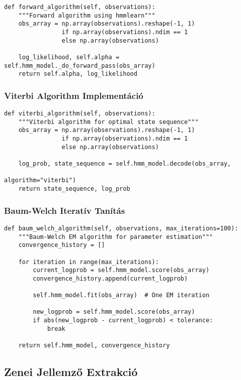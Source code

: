 \begin{verbatim}
def forward_algorithm(self, observations):
    """Forward algorithm using hmmlearn"""
    obs_array = np.array(observations).reshape(-1, 1) 
                if np.array(observations).ndim == 1 
                else np.array(observations)
    
    log_likelihood, self.alpha = self.hmm_model._do_forward_pass(obs_array)
    return self.alpha, log_likelihood
\end{verbatim}

\subsubsection{Viterbi Algorithm Implementáció}

\begin{verbatim}
def viterbi_algorithm(self, observations):
    """Viterbi algorithm for optimal state sequence"""
    obs_array = np.array(observations).reshape(-1, 1) 
                if np.array(observations).ndim == 1 
                else np.array(observations)
    
    log_prob, state_sequence = self.hmm_model.decode(obs_array, 
                                                   algorithm="viterbi")
    return state_sequence, log_prob
\end{verbatim}

\subsubsection{Baum-Welch Iteratív Tanítás}

\begin{verbatim}
def baum_welch_algorithm(self, observations, max_iterations=100):
    """Baum-Welch EM algorithm for parameter estimation"""
    convergence_history = []
    
    for iteration in range(max_iterations):
        current_logprob = self.hmm_model.score(obs_array)
        convergence_history.append(current_logprob)
        
        self.hmm_model.fit(obs_array)  # One EM iteration
        
        new_logprob = self.hmm_model.score(obs_array)
        if abs(new_logprob - current_logprob) < tolerance:
            break
            
    return self.hmm_model, convergence_history
\end{verbatim}

\subsection{Zenei Jellemző Extrakció}

